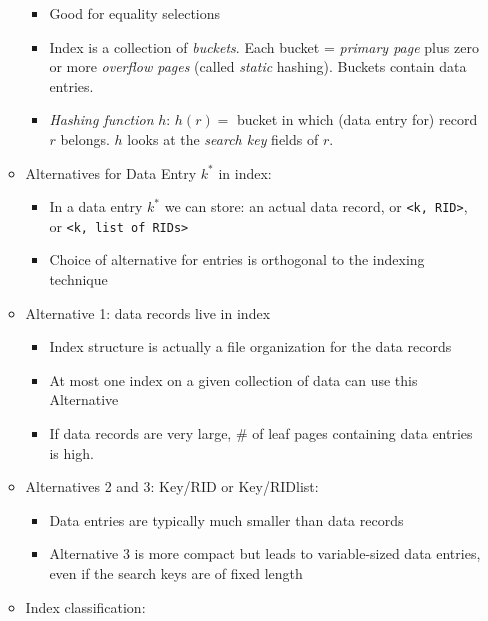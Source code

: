 \documentclass[landscape,8pt]{extarticle}
\newcommand{\code}{\lstinline}
\begin{document}
\begin{multicols}{4}
\begin{itemize}
\begin{itemize}
\begin{itemize}
                            \item Good for equality selections
                            \item Index is a collection of \emph{buckets}. Each bucket = \emph{primary page} plus zero or more \emph{overflow pages} (called \emph{static} hashing). Buckets contain data entries.
                            \item \emph{Hashing function} $h$: $h(r) = $ bucket in which (data entry for) record $r$ belongs. $h$ looks at the \emph{search key} fields of $r$.
                        \end{itemize}
                        \item Alternatives for Data Entry $k^*$ in index:
                        \begin{itemize}
                            \item In a data entry $k^*$ we can store: an actual data record, or \code{<k, RID>}, or \code{<k, list of RIDs>}
                            \item Choice of alternative for entries is orthogonal to the indexing technique
                        \end{itemize}
                        \item Alternative 1: data records live in index
                        \begin{itemize}
                            \item Index structure is actually a file organization for the data records
                            \item At most one index on a given collection of data can use this Alternative
                            \item If data records are very large, \# of leaf pages containing data entries is high.
                        \end{itemize}
                        \item Alternatives 2 and 3: Key/RID or Key/RIDlist:
                        \begin{itemize}
                            \item Data entries are typically much smaller than data records
                            \item Alternative 3 is more compact but leads to variable-sized data entries, even if the search keys are of fixed length
                        \end{itemize}
                        \item Index classification:

\end{itemize}
\end{itemize}
\end{multicols}
\end{document}
